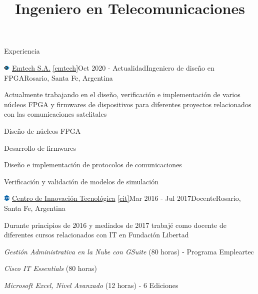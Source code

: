 \documentclass{resume} %
\title{\textbf{Ingeniero en Telecomunicaciones}}
\begin{document}

\begin{rSection}{Experiencia}

    \begin{rSubsection}{\includegraphics[height=0.3cm]{images/emtech.png} \href{http://emtech.com.ar/}{Emtech S.A.} \ref{emtech}}{Oct 2020 - Actualidad}{Ingeniero de diseño en FPGA}{Rosario, Santa Fe, Argentina}
        \item[]Actualmente trabajando en el diseño, verificación e implementación de varios núcleos FPGA y firmwares de dispositivos para diferentes proyectos relacionados con las comunicaciones satelitales
        \item Diseño de núcleos FPGA
        \item Desarrollo de firmwares
        \item Diseño e implementación de protocolos de comunicaciones
        \item Verificación y validación de modelos de simulación
    \end{rSubsection}


    \begin{rSubsection}{\includegraphics[height=0.3cm]{images/cit.png} \href{https://www.centroit.org.ar/}{Centro de Innovación Tecnológica} \ref{cit}}{Mar 2016 - Jul 2017}{Docente}{Rosario, Santa Fe, Argentina}
        \item[]Durante principios de 2016 y mediados de 2017 trabajé como docente de diferentes cursos relacionados con IT en Fundación Libertad
        \item \textit{Gestión Administrativa en la Nube con GSuite} (80 horas) - Programa Empleartec
        \item \textit{Cisco IT Essentials} (80 horas)
        \item \textit{Microsoft Excel, Nivel Avanzado} (12 horas) - 6 Ediciones
    \end{rSubsection}


\end{rSection}
\end{document}
